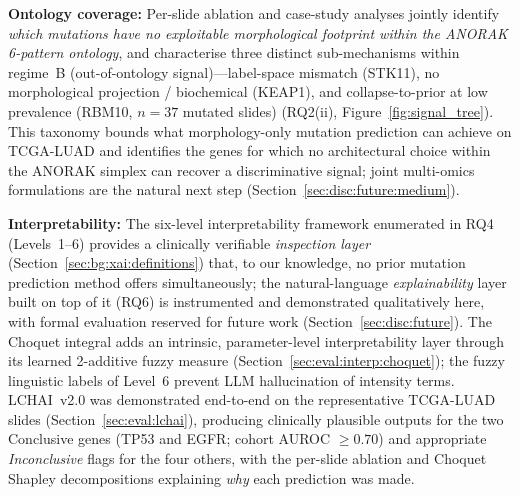 \textbf{Ontology coverage:}
Per-slide ablation and case-study analyses jointly identify
\emph{which mutations have no exploitable morphological footprint
within the ANORAK 6-pattern ontology}, and characterise three
distinct sub-mechanisms within regime~B (out-of-ontology
signal)---label-space mismatch (STK11), no morphological
projection / biochemical (KEAP1), and collapse-to-prior at low
prevalence (RBM10, $n = 37$ mutated slides) (RQ2(ii),
Figure~\ref{fig:signal_tree}).
This taxonomy bounds what morphology-only mutation prediction can
achieve on TCGA-LUAD and identifies the genes for which no
architectural choice within the ANORAK simplex can recover a
discriminative signal; joint multi-omics formulations are the
natural next step (Section~\ref{sec:disc:future:medium}).

\textbf{Interpretability:}
The six-level interpretability framework enumerated in RQ4
(Levels~1--6) provides a clinically verifiable
\emph{inspection layer} (Section~\ref{sec:bg:xai:definitions})
that, to our knowledge, no prior mutation prediction method
offers simultaneously; the natural-language
\emph{explainability} layer built on top of it (RQ6) is
instrumented and demonstrated qualitatively here, with formal
evaluation reserved for future work
(Section~\ref{sec:disc:future}).
The Choquet integral adds an intrinsic, parameter-level interpretability
layer through its learned 2-additive fuzzy measure
(Section~\ref{sec:eval:interp:choquet}); the fuzzy linguistic labels
of Level~6 prevent LLM hallucination of intensity terms.
LCHAI~v2.0 was demonstrated end-to-end on the representative
TCGA-LUAD slides (Section~\ref{sec:eval:lchai}), producing
clinically plausible outputs for the two Conclusive genes
(TP53 and EGFR; cohort AUROC $\geq 0.70$) and appropriate
\emph{Inconclusive} flags for the four others, with the per-slide
ablation and Choquet Shapley decompositions explaining
\emph{why} each prediction was made.